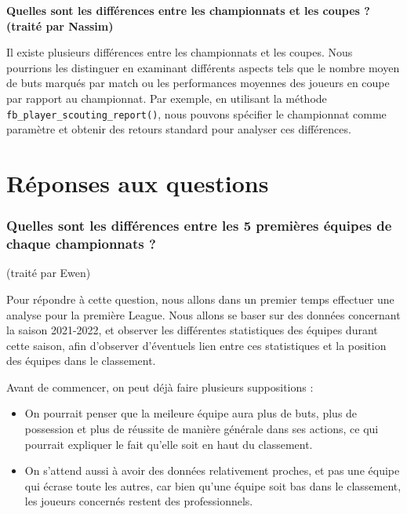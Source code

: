 \documentclass[
]{article}
\begin{document}
\textbf{Quelles sont les différences entre les championnats et les
coupes ? (traité par Nassim)}

Il existe plusieurs différences entre les championnats et les coupes.
Nous pourrions les distinguer en examinant différents aspects tels que
le nombre moyen de buts marqués par match ou les performances moyennes
des joueurs en coupe par rapport au championnat. Par exemple, en
utilisant la méthode \texttt{fb\_player\_scouting\_report()}, nous
pouvons spécifier le championnat comme paramètre et obtenir des retours
standard pour analyser ces différences.

\hypertarget{ruxe9ponses-aux-questions}{%
\section{Réponses aux questions}\label{ruxe9ponses-aux-questions}}

\hypertarget{quelles-sont-les-diffuxe9rences-entre-les-5-premiuxe8res-uxe9quipes-de-chaque-championnats}{%
\subsubsection{Quelles sont les différences entre les 5 premières
équipes de chaque championnats
?}\label{quelles-sont-les-diffuxe9rences-entre-les-5-premiuxe8res-uxe9quipes-de-chaque-championnats}}

(traité par Ewen)

Pour répondre à cette question, nous allons dans un premier temps
effectuer une analyse pour la première League. Nous allons se baser sur
des données concernant la saison 2021-2022, et observer les différentes
statistiques des équipes durant cette saison, afin d'observer
d'éventuels lien entre ces statistiques et la position des équipes dans
le classement.

Avant de commencer, on peut déjà faire plusieurs suppositions :

\begin{itemize}
\item
  On pourrait penser que la meileure équipe aura plus de buts, plus de
  possession et plus de réussite de manière générale dans ses actions,
  ce qui pourrait expliquer le fait qu'elle soit en haut du classement.
\item
  On s'attend aussi à avoir des données relativement proches, et pas une
  équipe qui écrase toute les autres, car bien qu'une équipe soit bas
  dans le classement, les joueurs concernés restent des professionnels.
\end{itemize}
\end{document}
